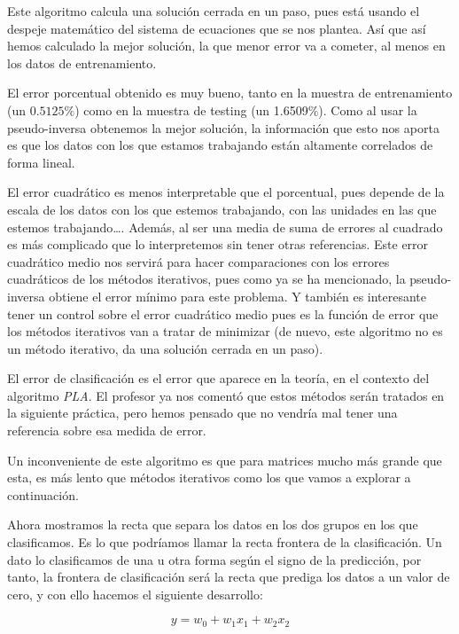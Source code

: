 \documentclass[11pt]{article}
\begin{document}
Este algoritmo calcula una solución cerrada en un paso, pues está usando el despeje matemático del sistema de ecuaciones que se nos plantea. Así que así hemos calculado la mejor solución, la que menor error va a cometer, al menos en los datos de entrenamiento.

El error porcentual obtenido es muy bueno, tanto en la muestra de entrenamiento (un $0.5125\%$) como en la muestra de testing (un 1.6509\%). Como al usar la pseudo-inversa obtenemos la mejor solución, la información que esto nos aporta es que los datos con los que estamos trabajando están altamente correlados de forma lineal.

El error cuadrático es menos interpretable que el porcentual, pues depende de la escala de los datos con los que estemos trabajando, con las unidades en las que estemos trabajando\ldots. Además, al ser una media de suma de errores al cuadrado es más complicado que lo interpretemos sin tener otras referencias. Este error cuadrático medio nos servirá para hacer comparaciones con los errores cuadráticos de los métodos iterativos, pues como ya se ha mencionado, la pseudo-inversa obtiene el error mínimo para este problema. Y también es interesante tener un control sobre el error cuadrático medio pues es la función de error que los métodos iterativos van a tratar de minimizar (de nuevo, este algoritmo no es un método iterativo, da una solución cerrada en un paso).

El error de clasificación es el error que aparece en la teoría, en el contexto del algoritmo \emph{PLA}. El profesor ya nos comentó que estos métodos serán tratados en la siguiente práctica, pero hemos pensado que no vendría mal tener una referencia sobre esa medida de error.

Un inconveniente de este algoritmo es que para matrices mucho más grande que esta, es más lento que métodos iterativos como los que vamos a explorar a continuación.

Ahora mostramos la recta que separa los datos en los dos grupos en los que clasificamos. Es lo que podríamos llamar la recta frontera de la clasificación. Un dato lo clasificamos de una u otra forma según el signo de la predicción, por tanto, la frontera de clasificación será la recta que prediga los datos a un valor de cero, y con ello hacemos el siguiente desarrollo:

\begin{displaymath}
y = w_0 + w_1 x_1 + w_2 x_2
\end{displaymath}
\end{document}
